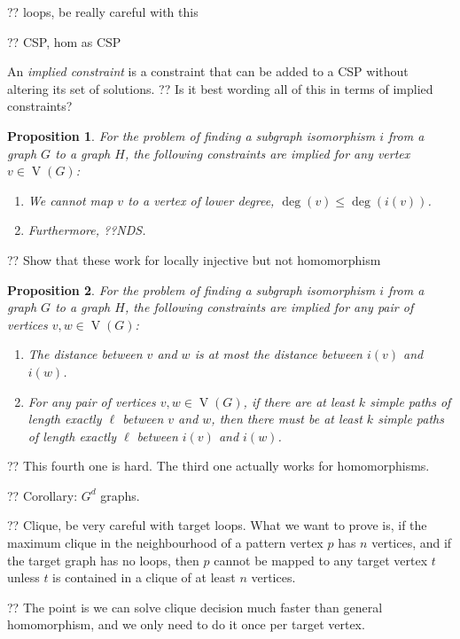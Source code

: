 \documentclass{article}
\newtheorem{proposition}{Proposition}
\newcommand{\vertexset}{\operatorname{V}}
\newcommand{\degree}{\operatorname{deg}}
\begin{document}
?? loops, be really careful with this

?? CSP, hom as CSP

An \emph{implied constraint} is a constraint that can be added to a CSP without altering its set of
solutions. ?? Is it best wording all of this in terms of implied constraints?

\begin{proposition}For the problem of finding a subgraph isomorphism $i$ from a graph $G$ to a graph
    $H$, the following constraints are implied for any vertex $v \in \vertexset(G)$:
    \begin{enumerate}
        \item We cannot map $v$ to a vertex of lower degree, $\degree(v) \le \degree(i(v))$.
        \item Furthermore, ??NDS.
    \end{enumerate}
\end{proposition}

?? Show that these work for locally injective but not homomorphism

\begin{proposition}For the problem of finding a subgraph isomorphism $i$ from a graph $G$ to a graph
    $H$, the following constraints are implied for any pair of vertices $v, w \in \vertexset(G)$:
    \begin{enumerate}
        \item The distance between $v$ and $w$ is at most the distance between $i(v)$ and $i(w)$.
        \item For any pair of vertices $v, w \in \vertexset(G)$, if there are at least $k$ simple
            paths of length exactly $\ell$ between $v$ and $w$, then there must be at least $k$
            simple paths of length exactly $\ell$ between $i(v)$ and $i(w)$.
    \end{enumerate}
\end{proposition}

?? This fourth one is hard. The third one actually works for homomorphisms.

?? Corollary: $G^d$ graphs.

?? Clique, be very careful with target loops. What we want to prove is, if the maximum clique in the
neighbourhood of a pattern vertex $p$ has $n$ vertices, and if the target graph has no loops, then
$p$ cannot be mapped to any target vertex $t$ unless $t$ is contained in a clique of at least $n$
vertices.

?? The point is we can solve clique decision much faster than general homomorphism, and we only need
to do it once per target vertex.
\end{document}
